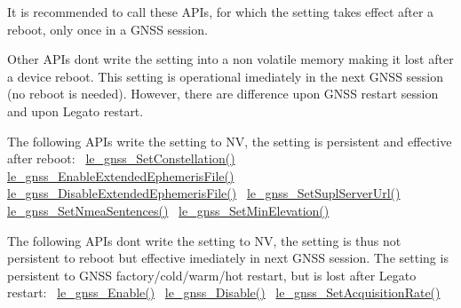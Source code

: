 It is recommended to call these A\+P\+Is, for which the setting takes effect after a reboot, only once in a G\+N\+SS session.

Other A\+P\+Is don\textquotesingle{}t write the setting into a non volatile memory making it lost after a device reboot. This setting is operational imediately in the next G\+N\+SS session (no reboot is needed). However, there are difference upon G\+N\+SS restart session and upon Legato restart.

The following A\+P\+Is write the setting to NV, the setting is persistent and effective after reboot\+:~\newline
 \hyperlink{le__gnss__interface_8h_a6dbdc58f23e480e65ea16c583ef5340f}{le\+\_\+gnss\+\_\+\+Set\+Constellation()}~\newline
 \hyperlink{le__gnss__interface_8h_a3474bb912febeca6e258c6039144f39f}{le\+\_\+gnss\+\_\+\+Enable\+Extended\+Ephemeris\+File()}~\newline
 \hyperlink{le__gnss__interface_8h_a49d596f01c010f7828c949f1436246df}{le\+\_\+gnss\+\_\+\+Disable\+Extended\+Ephemeris\+File()}~\newline
 \hyperlink{le__gnss__interface_8h_a92e3a26e2ba3c220a282fad8817c41be}{le\+\_\+gnss\+\_\+\+Set\+Supl\+Server\+Url()}~\newline
 \hyperlink{le__gnss__interface_8h_ab9253e29d74cae6e962dcc8b94f0e3c1}{le\+\_\+gnss\+\_\+\+Set\+Nmea\+Sentences()}~\newline
 \hyperlink{le__gnss__interface_8h_a78982eb8669530eef1bbc79ff79347e4}{le\+\_\+gnss\+\_\+\+Set\+Min\+Elevation()}~\newline


The following A\+P\+Is don\textquotesingle{}t write the setting to NV, the setting is thus not persistent to reboot but effective imediately in next G\+N\+SS session. The setting is persistent to G\+N\+SS factory/cold/warm/hot restart, but is lost after Legato restart\+:~\newline
 \hyperlink{le__gnss__interface_8h_a8e1d96b1b64055b298a74cad1acfbbf8}{le\+\_\+gnss\+\_\+\+Enable()}~\newline
 \hyperlink{le__gnss__interface_8h_aa2cd87c616f968370e9e2113570437ea}{le\+\_\+gnss\+\_\+\+Disable()}~\newline
 \hyperlink{le__gnss__interface_8h_a75d96ec7ac6e0d6b58525e4c523d3b2c}{le\+\_\+gnss\+\_\+\+Set\+Acquisition\+Rate()}~\newline


